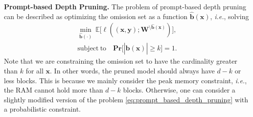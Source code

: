 \textbf{Prompt-based Depth Pruning.} The problem of prompt-based depth pruning can be described as optimizing the omission set as a function $\hat{\mathbf{b}}( \mathbf{x})$, \textit{i.e.}, solving
\begin{align}
\min_{\hat{\mathbf{b}}(\cdot)} \:\mathbb{E}\big[ \ell((\mathbf{x},\mathbf{y}); \mathbf{W}^{\setminus \hat{\mathbf{b}}(\mathbf{x})})\big] \label{eq:prompt_based_depth_pruning},\\
\mathrm{subject\:to}\quad \mathbf{Pr}\big[|\hat{\mathbf{b}}(\mathbf{x})| \ge k\big] = 1.\nonumber
\end{align}
Note that we are constraining the omission set to have the cardinality greater than $k$ for all $\mathbf{x}$. In other words, the pruned model should always have $d-k$ or less blocks. This is because we mainly consider the peak memory constraint, \textit{i.e.}, the RAM cannot hold more than $d-k$ blocks. Otherwise, one can consider a slightly modified version of the problem \eqref{eq:prompt_based_depth_pruning} with a probabilistic constraint.